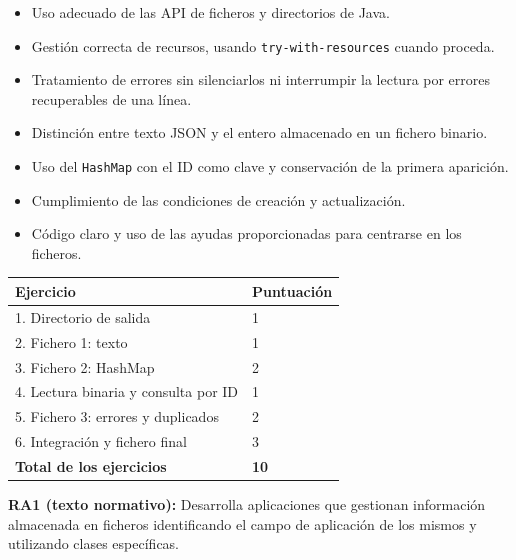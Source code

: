 \documentclass[a4paper,12pt]{article}
\begin{document}
\begin{itemize}
\item Uso adecuado de las API de ficheros y directorios de Java.
\item Gestión correcta de recursos, usando \texttt{try-with-resources} cuando proceda.
\item Tratamiento de errores sin silenciarlos ni interrumpir la lectura por errores recuperables de una línea.
\item Distinción entre texto JSON y el entero almacenado en un fichero binario.
\item Uso del \texttt{HashMap} con el ID como clave y conservación de la primera aparición.
\item Cumplimiento de las condiciones de creación y actualización.
\item Código claro y uso de las ayudas proporcionadas para centrarse en los ficheros.
\end{itemize}

\begin{tabularx}{\textwidth}{|X|p{4cm}|}\hline
\rowcolor{primary} \color{white}\bfseries Ejercicio & \color{white}\bfseries Puntuación \\ \hline
1. Directorio de salida & 1 \\ \hline
2. Fichero 1: texto & 1 \\ \hline
3. Fichero 2: HashMap & 2 \\ \hline
4. Lectura binaria y consulta por ID & 1 \\ \hline
5. Fichero 3: errores y duplicados & 2 \\ \hline
6. Integración y fichero final & 3 \\ \hline
\textbf{Total de los ejercicios} & \textbf{10} \\ \hline
\end{tabularx}
\clearpage
\appendix

\begin{tcolorbox}[title={Resultado de aprendizaje},breakable]
\textbf{RA1 (texto normativo):} Desarrolla aplicaciones que gestionan información almacenada en ficheros identificando el campo de aplicación de los mismos y utilizando clases específicas.
\end{tcolorbox}
\end{document}
